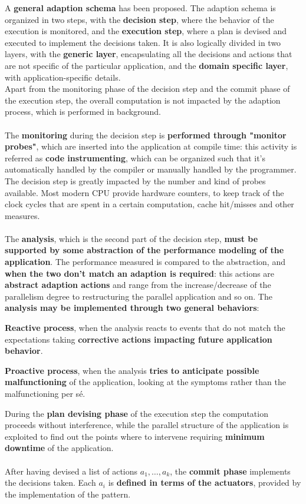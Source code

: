 \documentclass[10pt]{report}
\begin{document}
A \textbf{general adaption schema} has been proposed. The adaption schema is organized in two steps, with the \textbf{decision step}, where the behavior of the execution is monitored, and the \textbf{execution step}, where a plan is devised and executed to implement the decisions taken. It is also logically divided in two layers, with the \textbf{generic layer}, encapsulating all the decisions and actions that are not specific of the particular application, and the \textbf{domain specific layer}, with application-specific details.\\
Apart from the monitoring phase of the decision step and the commit phase of the execution step, the overall computation is not impacted by the adaption process, which is performed in background.\\\\
The \textbf{monitoring} during the decision step is \textbf{performed through "monitor probes"}, which are inserted into the application at compile time: this activity is referred as \textbf{code instrumenting}, which can be organized such that it's automatically handled by the compiler or manually handled by the programmer. The decision step is greatly impacted by the number and kind of probes available. Most modern CPU provide hardware counters, to keep track of the clock cycles that are spent in a certain computation, cache hit/misses and other measures.\\\\
The \textbf{analysis}, which is the second part of the decision step, \textbf{must be supported by some abstraction of the performance modeling of the application}. The performance measured is compared to the abstraction, and \textbf{when the two don't match an adaption is required}: this actions are \textbf{abstract adaption actions} and range from the increase/decrease of the parallelism degree to restructuring the parallel application and so on. The \textbf{analysis may be implemented through two general behaviors}:
\begin{list}{}{}
	\item \textbf{Reactive process}, when the analysis reacts to events that do not match the expectations taking \textbf{corrective actions impacting future application behavior}.
	\item \textbf{Proactive process}, when the analysis \textbf{tries to anticipate possible malfunctioning} of the application, looking at the symptoms rather than the malfunctioning per sé.
\end{list}
During the \textbf{plan devising phase} of the execution step the computation proceeds without interference, while the parallel structure of the application is exploited to find out the points where to intervene requiring \textbf{minimum downtime} of the application.\\\\
After having devised a list of actions $a_1,\ldots,a_k$, the \textbf{commit phase} implements the decisions taken. Each $a_i$ is \textbf{defined in terms of the actuators}, provided by the implementation of the pattern.
\end{document}
